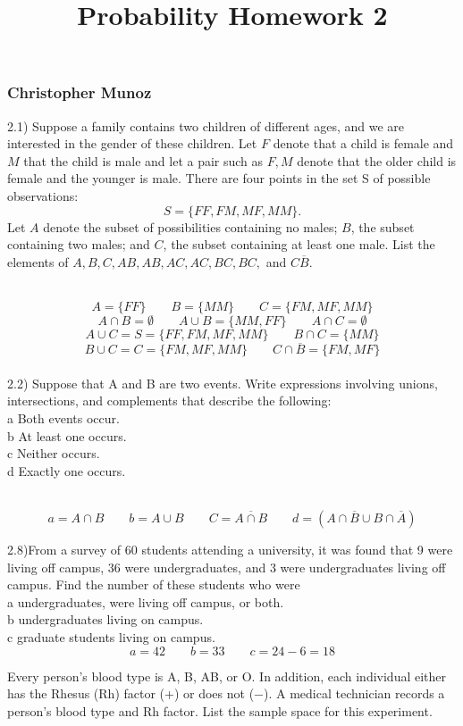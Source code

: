 \documentclass[
]{article}
\title{Probability Homework 2}
\author{}
\date{\vspace{-2.5em}}
\begin{document}
\maketitle

\subsubsection{Christopher Munoz}\label{christopher-munoz}

2.1) Suppose a family contains two children of different ages, and we
are interested in the gender of these children. Let \(F\) denote that a
child is female and \(M\) that the child is male and let a pair such as
\(F,M\) denote that the older child is female and the younger is male.
There are four points in the set S of possible
observations:\[S = \{F F, F M, M F, M M\}.\]Let \(A\) denote the subset
of possibilities containing no males; \(B\), the subset containing two
males; and \(C\), the subset containing at least one male. List the
elements of \(A, B, C, A  B, A  B, A  C, A  C, B  C, B  C,\) and
\(C  \overline{B}\).\\
\strut \\
\[ A = \{FF\} \qquad B = \{MM\} \qquad C = \{FM, MF, MM\}\]
\[A \cap B = \emptyset \qquad A\cup B = \{MM,FF\} \qquad A \cap C = \emptyset\]
\[A \cup C = S = \{FF, FM, MF, MM\} \qquad B \cap C = \{MM\} \] \[
B \cup C = C = \{FM, MF, MM\} \qquad C \cap \overline{B} = \{FM, MF\} \]\\

2.2) Suppose that A and B are two events. Write expressions involving
unions, intersections, and complements that describe the following:\\
a Both events occur.\\
b At least one occurs.\\
c Neither occurs.\\
d Exactly one occurs.\\
\strut \\
\[a = A \cap B \qquad b = A \cup B \qquad C = \overline{A \cap B} \qquad d = (A \cap \overline{B} \cup B \cap \overline{A})\]

2.8)From a survey of 60 students attending a university, it was found
that 9 were living off campus, 36 were undergraduates, and 3 were
undergraduates living off campus. Find the number of these students who
were\\
a undergraduates, were living off campus, or both.\\
b undergraduates living on campus.\\
c graduate students living on campus.\\

\[
a = 42 \qquad b = 33 \qquad c = 24 - 6 = 18
\]

\hfill\break
Every person's blood type is A, B, AB, or O. In addition, each
individual either has the Rhesus (Rh) factor (+) or does not (−). A
medical technician records a person's blood type and Rh factor. List the
sample space for this experiment.
\end{document}

